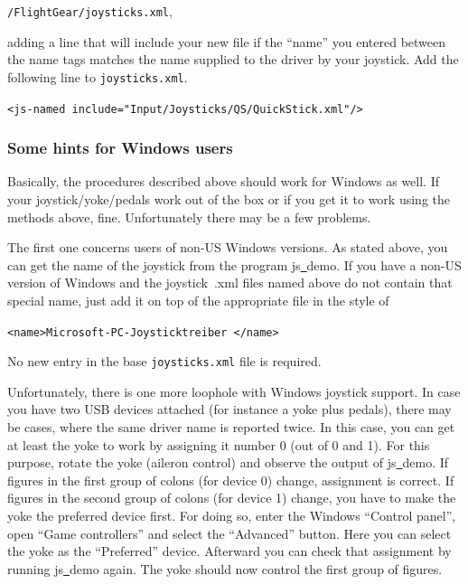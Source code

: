 \noindent
 \texttt{/FlightGear/joysticks.xml},


\noindent 
adding a line that will include your new file if the ``name'' you entered between the name tags matches the name supplied to the driver by your joystick.  Add the following line to \texttt{joysticks.xml}.
\medskip

\noindent
	\texttt{<js-named include="Input/Joysticks/QS/QuickStick.xml"/>}
\medskip

\subsubsection{Some hints for Windows users\label{joyxp}}
Basically, the procedures described above should work for Windows as well. If your joystick/yoke/pedals work out of the box or if you get it to work using the methods above, fine. Unfortunately there may be a few problems.

The first one concerns users of non-US Windows versions. As stated above, you can get the name of the joystick from the program js\underline{~}demo. If you have a non-US version of Windows and the joystick~.xml files named above do not contain that special name, just add it on top of the appropriate file in the style of
\medskip

 \texttt{<name>Microsoft-PC-Joysticktreiber </name>}
 \medskip

\noindent
No new entry in the base \texttt{joysticks.xml} file is required.

Unfortunately, there is one more loophole with Windows joystick support. In
case you have two USB devices attached (for instance a yoke plus pedals),
there may be cases, where the same driver name is reported twice. In this
case, you can get at least the yoke to work by assigning it number 0 (out of
0 and 1). For this purpose, rotate the yoke (aileron control) and observe
the output of js\underline{~}demo. If figures in the first group of colons
(for device 0) change, assignment is correct. If figures in the second group
of colons (for device 1) change, you have to make the yoke the preferred
device first. For doing so, enter the
Windows ``Control panel'', open ``Game controllers'' and select the
``Advanced'' button. Here you can select the yoke as the ``Preferred''
device. Afterward you can check that assignment by running
js\underline{~}demo again. The yoke should now control the first group of
figures.


